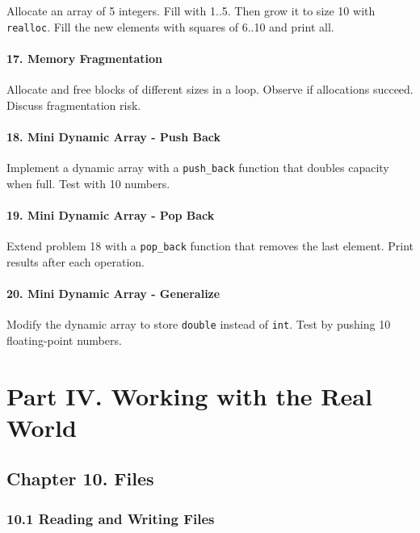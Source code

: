 \documentclass[
  letterpaper,
  DIV=11,
  numbers=noendperiod]{scrreprt}
\begin{document}
Allocate an array of 5 integers. Fill with 1..5. Then grow it to size 10
with \texttt{realloc}. Fill the new elements with squares of 6..10 and
print all.

\subsubsection{17. Memory Fragmentation}\label{memory-fragmentation}

Allocate and free blocks of different sizes in a loop. Observe if
allocations succeed. Discuss fragmentation risk.

\subsubsection{18. Mini Dynamic Array - Push
Back}\label{mini-dynamic-array---push-back}

Implement a dynamic array with a \texttt{push\_back} function that
doubles capacity when full. Test with 10 numbers.

\subsubsection{19. Mini Dynamic Array - Pop
Back}\label{mini-dynamic-array---pop-back}

Extend problem 18 with a \texttt{pop\_back} function that removes the
last element. Print results after each operation.

\subsubsection{20. Mini Dynamic Array -
Generalize}\label{mini-dynamic-array---generalize}

Modify the dynamic array to store \texttt{double} instead of
\texttt{int}. Test by pushing 10 floating-point numbers.


\chapter{Part IV. Working with the Real
World}\label{part-iv.-working-with-the-real-world}

\section{Chapter 10. Files}\label{chapter-10.-files}

\subsection{10.1 Reading and Writing
Files}\label{reading-and-writing-files}
\end{document}
